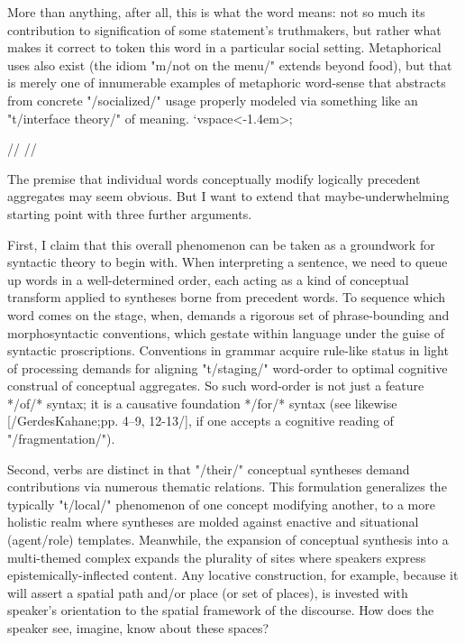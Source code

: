 More than anything, after all, this is what the word means: not so 
much its contribution to signification of some statement's truthmakers, 
but rather what makes it correct to token this word in a particular social setting.  
Metaphorical uses also exist (the idiom "m/not on the menu/" 
extends beyond food), but that is merely one of innumerable examples 
of metaphoric word-sense that abstracts from concrete 
"/socialized/" usage properly modeled via something like an 
"t/interface theory/" of meaning. `vspace<-1.4em>;

// //
      
The premise that individual words conceptually modify logically 
precedent aggregates may seem obvious.  But I want to extend that 
maybe-underwhelming starting point with three further arguments.

First, I claim that this overall phenomenon can be taken as a 
groundwork for syntactic theory to begin with.  
When interpreting a sentence, we need to queue up words 
in a well-determined order, each acting as a 
kind of conceptual transform applied to 
syntheses borne from precedent words.  To sequence 
which word comes on the stage, when, demands a 
rigorous set of phrase-bounding and morphosyntactic 
conventions, which gestate within language 
under the guise of syntactic proscriptions.  
Conventions in grammar acquire rule-like status   
in light of processing demands for aligning "t/staging/" 
word-order to optimal cognitive construal of conceptual 
aggregates.  So such word-order is not just a feature 
*/of/* syntax; it is a causative foundation */for/* 
syntax (see likewise [/GerdesKahane;pp. 4--9, 12-13/], 
if one accepts a cognitive reading of "/fragmentation/").

Second, verbs are distinct in that "/their/" conceptual syntheses  
demand contributions via numerous thematic relations.  
This formulation generalizes the typically "t/local/" phenomenon 
of one concept modifying another, to a more holistic 
realm where syntheses are molded against enactive 
and situational (agent/role) templates.  Meanwhile, the expansion of conceptual 
synthesis into a multi-themed complex expands the plurality of sites 
where speakers express epistemically-inflected content.  
Any locative construction, for example, because it will assert a 
spatial path and/or place (or set of places), is invested with 
speaker's orientation to the spatial framework of the discourse.  
How does the speaker see, imagine, know about these spaces?

